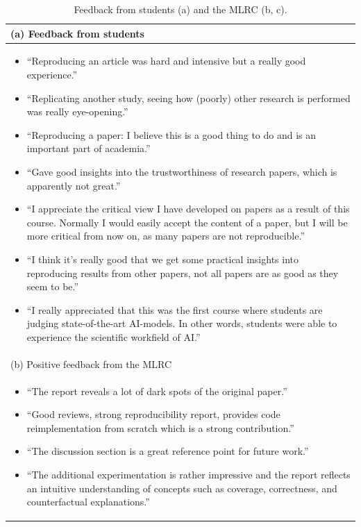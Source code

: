 \documentclass[letterpaper]{article}
\begin{document}
\begin{table}[htbp!]
\caption{Feedback from students (a) and the MLRC (b, c).}
\centering
\begin{tabular}{@{}l@{}}
\toprule
(a) Feedback from students \\
\midrule
\begin{minipage}[t]{\columnwidth}
\begin{itemize}[leftmargin=*]
    \item ``Reproducing an article was hard and intensive but a really good experience.''
     \item ``Replicating another study, seeing how (poorly) other research is performed was really eye-opening.''
    \item ``Reproducing a paper: I believe this is a good thing to do and is an important part of academia.''
    \item  ``Gave good insights into the trustworthiness of research papers, which is apparently not great.''
    \item ``I appreciate the critical view I have developed on papers as a result of this course. Normally I would easily accept the content of a paper, but I will be more critical from now on, as many papers are not reproducible.''
    \item ``I think it's really good that we get some practical insights into reproducing results from other papers, not all papers are as good as they seem to be.''
    \item ``I really appreciated that this was the first course where students are judging state-of-the-art AI-models. In other words, students were able to experience the scientific workfield of AI.''
\end{itemize}
\end{minipage}
\\
\midrule
(b) Positive feedback from the MLRC \\
\midrule
\begin{minipage}[t]{\columnwidth}
\begin{itemize}[leftmargin=*]
\item ``The report reveals a lot of dark spots of the original paper.''
\item ``Good reviews, strong reproducibility report, provides code reimplementation from scratch which is a strong contribution.''
\item ``The discussion section is a great reference point for future work.''
\item ``The additional experimentation is rather impressive and the report reflects  an intuitive understanding of concepts such as  coverage, correctness, and counterfactual explanations.''

\end{itemize}
\end{minipage}
\end{tabular}
\end{table}
\end{document}
